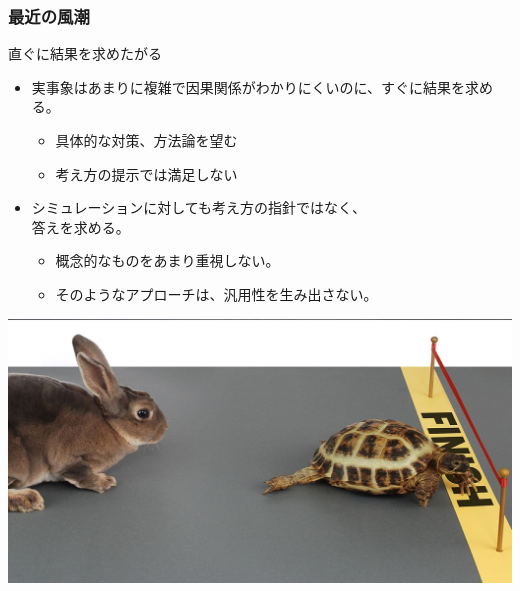\documentclass[unicode,12pt]{beamer}%
\begin{document}
\begin{frame}
    \frametitle{最近の風潮}
            \begin{block}{直ぐに結果を求めたがる}
                \begin{itemize}
                    \item 実事象はあまりに複雑で因果関係がわかりにくいのに、すぐに結果を求める。
                    \begin{itemize}
                        \item 具体的な対策、方法論を望む
                        \item 考え方の提示では満足しない
                    \end{itemize}
                    \item シミュレーションに対しても考え方の指針ではなく、\\答えを求める。
                    \begin{itemize}
                        \item 概念的なものをあまり重視しない。
                        \item そのようなアプローチは、汎用性を生み出さない。
                    \end{itemize}
                \end{itemize}

                    \centering
                        \includegraphics[width=.4\textwidth]{usagi_kame.jpg}
                
            \end{block}
\end{frame}
\end{document}
